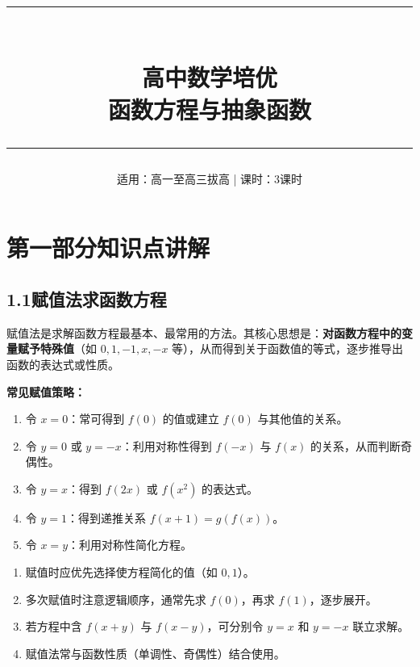 \documentclass[12pt,a4paper]{ctexart}
\title{%
  \vspace{-1cm}
  \textcolor{mainblue}{\rule{\textwidth}{1.5pt}}\\[6pt]
  {\Huge\bfseries\textcolor{mainblue}{高中数学培优}}\\[4pt]
  {\LARGE 函数方程与抽象函数}\\[4pt]
  \textcolor{mainblue}{\rule{\textwidth}{1.5pt}}
}
\author{}
\date{%
  适用：高一至高三拔高 \quad | \quad 课时：3课时
}
\begin{document}
\maketitle
\thispagestyle{fancy}

\section*{\textcolor{mainblue}{第一部分\quad 知识点讲解}}

\subsection*{1.1\quad 赋值法求函数方程}

\begin{knowledgebox}[赋值法核心思想]
赋值法是求解函数方程最基本、最常用的方法。其核心思想是：\textbf{对函数方程中的变量赋予特殊值}（如 $0,1,-1,x,-x$ 等），从而得到关于函数值的等式，逐步推导出函数的表达式或性质。

\medskip
\textbf{常见赋值策略：}
\begin{enumerate}[label=(\arabic*)]
  \item 令 $x=0$：常可得到 $f(0)$ 的值或建立 $f(0)$ 与其他值的关系。
  \item 令 $y=0$ 或 $y=-x$：利用对称性得到 $f(-x)$ 与 $f(x)$ 的关系，从而判断奇偶性。
  \item 令 $y=x$：得到 $f(2x)$ 或 $f(x^2)$ 的表达式。
  \item 令 $y=1$：得到递推关系 $f(x+1)=g(f(x))$。
  \item 令 $x=y$：利用对称性简化方程。
\end{enumerate}
\end{knowledgebox}

\begin{tipbox}[赋值法使用技巧]
\begin{enumerate}[label=(\arabic*)]
  \item 赋值时应优先选择使方程简化的值（如 $0,1$）。
  \item 多次赋值时注意逻辑顺序，通常先求 $f(0)$，再求 $f(1)$，逐步展开。
  \item 若方程中含 $f(x+y)$ 与 $f(x-y)$，可分别令 $y=x$ 和 $y=-x$ 联立求解。
  \item 赋值法常与函数性质（单调性、奇偶性）结合使用。
\end{enumerate}
\end{tipbox}
\end{document}
